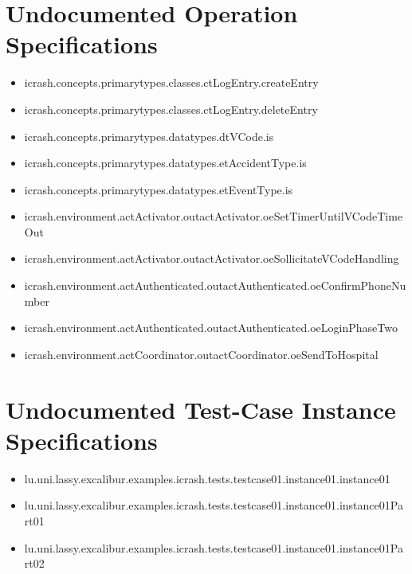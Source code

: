 \section[Undocumented Operation Specifications]{Undocumented Operation Specifications}
\begin{itemize}
\item icrash.concepts.primarytypes.classes.ctLogEntry.createEntry 
\item icrash.concepts.primarytypes.classes.ctLogEntry.deleteEntry 
\item icrash.concepts.primarytypes.datatypes.dtVCode.is 
\item icrash.concepts.primarytypes.datatypes.etAccidentType.is 
\item icrash.concepts.primarytypes.datatypes.etEventType.is 
\item icrash.environment.actActivator.outactActivator.oeSetTimerUntilVCodeTimeOut 
\item icrash.environment.actActivator.outactActivator.oeSollicitateVCodeHandling 
\item icrash.environment.actAuthenticated.outactAuthenticated.oeConfirmPhoneNumber 
\item icrash.environment.actAuthenticated.outactAuthenticated.oeLoginPhaseTwo 
\item icrash.environment.actCoordinator.outactCoordinator.oeSendToHospital 
\end{itemize}





\section[Undocumented Test-Case Instance Specifications]{Undocumented Test-Case Instance Specifications}
\begin{itemize}
\item lu.uni.lassy.excalibur.examples.icrash.tests.testcase01.instance01.instance01 
\item lu.uni.lassy.excalibur.examples.icrash.tests.testcase01.instance01.instance01Part01 
\item lu.uni.lassy.excalibur.examples.icrash.tests.testcase01.instance01.instance01Part02 
\end{itemize}



